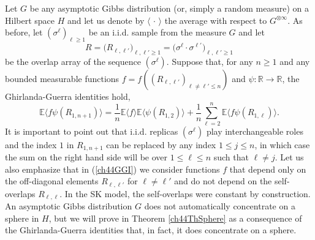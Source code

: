 \documentclass[12pt]{article}
\newcommand{\e}{\mathbb{E}}
\newcommand{\Reals}{\mathbb{R}}
\newcommand{\la}{\langle}
\newcommand{\ra}{\rangle}
\theoremstyle{nonumberplain}
\begin{document}
Let $G$ be any asymptotic Gibbs distribution (or, simply a random measure) on a Hilbert space $H$ and let us denote by $\la\,\cdot\,\ra$ the average with respect to $G^{\otimes \infty}$. As before, let $(\sigma^\ell)_{\ell\geq 1}$ be an i.i.d. sample from the measure $G$ and let 
\begin{equation}
R= \bigl(R_{\ell,\ell'}\bigr)_{\ell,\ell'\geq 1} =\bigl( \sigma^\ell \cdot \sigma^{\ell'}\bigr)_{\ell,\ell'\geq 1}
\label{ch44overlaps}
\end{equation} 
be the overlap array of the sequence $(\sigma^{\ell})$. Suppose that, for any $n\geq 1$ and any bounded measurable functions $f=f((R_{\ell,\ell'})_{\ell\not =\ell'\leq n})$ and $\psi: \Reals \to \Reals$, the Ghirlanda-Guerra identities hold,\vspace{-0.6mm}
\begin{equation}
\e\bigl\la  f \psi(R_{1,n+1})\bigr\ra
=
\frac{1}{n}\e\bigl\la  f\bigr\ra \e\bigl\la \psi(R_{1,2})\bigr\ra
+
\frac{1}{n} \sum_{\ell=2}^n \e\bigl\la  f \psi(R_{1,\ell})\bigr\ra.
\label{ch44GGI}
\end{equation}
It is important to point out that i.i.d. replicas $(\sigma^{\ell})$ play interchangeable roles and the index $1$ in $R_{1,n+1}$ can be replaced by any index $1\leq j\leq n$, in which case the sum on the right hand side will be over $1\leq \ell\leq n$ such that $\ell\not = j$.  Let us also emphasize that in (\ref{ch44GGI}) we consider functions $f$ that depend only on the off-diagonal elements $R_{\ell,\ell'}$ for $\ell\not = \ell'$ and do not depend on the self-overlaps $R_{\ell,\ell}$. In the SK model, the self-overlaps were constant by construction. An asymptotic Gibbs distribution $G$ does not automatically concentrate on a sphere in $H$, but we will prove in Theorem \ref{ch44ThSphere} as a consequence of the Ghirlanda-Guerra identities that, in fact, it does concentrate on a sphere.
\end{document}
